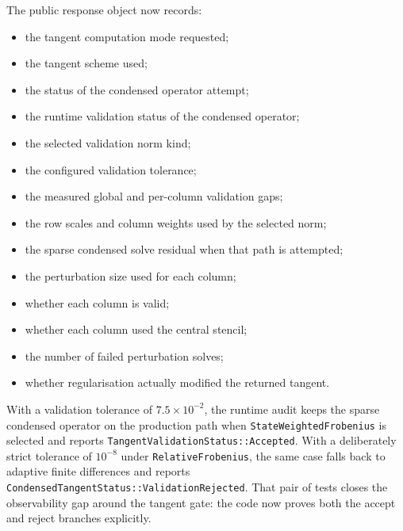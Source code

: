 The public response object now records:
\begin{itemize}
  \item the tangent computation mode requested;
  \item the tangent scheme used;
  \item the status of the condensed operator attempt;
  \item the runtime validation status of the condensed operator;
  \item the selected validation norm kind;
  \item the configured validation tolerance;
  \item the measured global and per-column validation gaps;
  \item the row scales and column weights used by the selected norm;
  \item the sparse condensed solve residual when that path is attempted;
  \item the perturbation size used for each column;
  \item whether each column is valid;
  \item whether each column used the central stencil;
  \item the number of failed perturbation solves;
\item whether regularisation actually modified the returned tangent.
\end{itemize}

With a validation tolerance of \(7.5\times 10^{-2}\), the runtime audit keeps
the sparse condensed operator on the production path when
\texttt{StateWeightedFrobenius} is selected and reports
\texttt{TangentValidationStatus::Accepted}.  With a deliberately strict
tolerance of \(10^{-8}\) under \texttt{RelativeFrobenius}, the same case falls
back to adaptive finite differences and reports
\texttt{CondensedTangentStatus::ValidationRejected}.  That pair of tests closes
the observability gap around the tangent gate: the code now proves both the
accept and reject branches explicitly.

